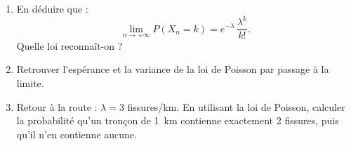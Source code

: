 \begin{enumerate}
    \item En déduire que :
    $$
    \lim_{n \to +\infty} P(X_n = k) = e^{-\lambda}\,\frac{\lambda^k}{k!}.
    $$
    Quelle loi reconnaît-on ?

    \item Retrouver l'espérance et la variance de la loi de Poisson par passage à la limite.

    \item Retour à la route : $\lambda = 3$ fissures/km. En utilisant la loi de Poisson, calculer la probabilité qu'un tronçon de 1~km contienne exactement 2 fissures, puis qu'il n'en contienne aucune.
\end{enumerate}


